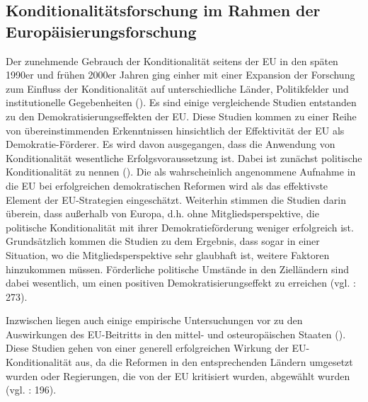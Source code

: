 \subsection{Konditionalitätsforschung im Rahmen der Europäisierungsforschung }
Der zunehmende Gebrauch der Konditionalität seitens der EU in den späten 1990er und frühen 2000er Jahren ging einher mit einer Expansion der Forschung zum Einfluss der Konditionalität auf unterschiedliche Länder, Politikfelder und institutionelle Gegebenheiten (\cite{grab99, grab01, grab03, schsed04, schsed05b, schsed05c, vachudova01, vachudova05}). Es sind einige vergleichende Studien entstanden zu den Demokratisierungseffekten der EU. Diese Studien kommen zu einer Reihe von übereinstimmenden Erkenntnissen hinsichtlich der Effektivität der EU als Demokratie-Förderer. Es wird davon ausgegangen, dass die Anwendung von Konditionalität wesentliche Erfolgsvoraussetzung ist. Dabei ist zunächst politische Konditionalität zu nennen (\cite{kelley, kubicek, pridham05, schetal, vachudova05, youngs}). Die als wahrscheinlich angenommene Aufnahme in die EU bei erfolgreichen demokratischen Reformen wird als das effektivste Element der EU-Strategien eingeschätzt. Weiterhin stimmen die Studien darin überein, dass außerhalb von Europa, d.h. ohne Mitgliedsperspektive, die politische Konditionalität mit ihrer Demokratieförderung weniger erfolgreich ist. Grundsätzlich kommen die Studien zu dem Ergebnis, dass sogar in einer Situation, wo die Mitgliedsperspektive sehr glaubhaft ist, weitere Faktoren hinzukommen müssen. Förderliche politische Umstände in den Zielländern sind dabei wesentlich, um einen positiven Demokratisierungseffekt zu erreichen (vgl. \cite{schsch07} : 273).\par
Inzwischen liegen auch einige empirische Untersuchungen vor zu den Auswirkungen des EU-Beitritts in den mittel- und osteuropäischen Staaten (\cite{dimit02, grab05, kneuer07, linden, schsed05a}). Diese Studien gehen von einer generell erfolgreichen Wirkung der EU-Konditionalität aus, da die Reformen in den entsprechenden Ländern umgesetzt wurden oder Regierungen, die von der EU kritisiert wurden, abgewählt wurden (vgl. \cite{brusis09} : 196).\par

